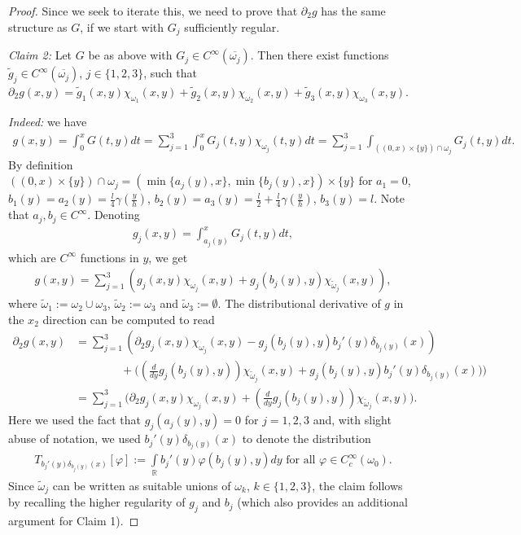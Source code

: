 \documentclass[a4paper, 10pt, twoside, notitlepage]{amsart}
\theoremstyle{plain}
\newcommand{\R}{\mathbb{R}}
\newcommand{\p}{\partial}
\begin{document}
\begin{proof}
\smallskip

Since we seek to iterate this, we need to prove that $\p_2 g$ has the same structure as $G$, if we start with $G_j$ sufficiently regular.

\smallskip

\emph{Claim 2:} Let $G$ be as above with $G_j\in C^\infty(\overline{\omega_j})$. Then there exist functions $\tilde g_j\in C^\infty(\overline{\omega_j})$, $j \in \{1,2,3\}$, such that $\p_2 g(x,y)=\tilde g_1(x,y)\chi_{\omega_1}(x,y)+\tilde g_2(x,y)\chi_{\omega_2}(x,y)+\tilde g_3(x,y)\chi_{\omega_3}(x,y)$.

\smallskip

\emph{Indeed:} we have
\begin{align*}
g(x,y)=\int_0^x G(t,y)dt = \sum_{j=1}^3 \int_0^x G_j(t,y)\chi_{\omega_j}(t,y)dt= \sum_{j=1}^3 \int_{((0,x)\times\{y\})\cap\omega_j} G_j(t,y)dt.
\end{align*}
By definition $((0,x)\times\{y\})\cap\omega_j=(\min\{a_j(y), x\}, \min\{b_j(y), x\})\times\{y\}$ for  $a_1=0$, $b_1(y)=a_2(y)=\frac{l}{4}\gamma(\frac{y}{h})$, $b_2(y)=a_3(y)=\frac{l}{2}+\frac{l}{4}\gamma(\frac{y}{h})$, $b_3(y)=l$. Note that $a_j, b_j\in C^\infty$.
Denoting
\begin{align*}
g_j(x,y)=\int_{a_j(y)}^x G_j(t,y)dt,
\end{align*}
which are $C^\infty$ functions in $y$, we get
\begin{align*}
g(x,y)=\sum_{j=1}^3 \left(g_j(x,y)\chi_{\omega_j}(x,y)+g_j(b_j(y),y)\chi_{\tilde\omega_j}(x,y) \right),
\end{align*}
where $\tilde \omega_1:=\omega_2\cup\omega_3$, $\tilde\omega_2:=\omega_3$ and $\tilde\omega_3:=\emptyset$.
The distributional derivative of $g$ in the $x_2$ direction can be computed to read
\begin{align*}
\p_2 g(x,y) &= \sum_{j=1}^3(\p_2g_j(x,y)\chi_{\omega_j}(x,y)-g_j(b_{j}(y),y) b_j'(y)\delta_{b_{j}(y)}(x)) \\
&\qquad\qquad +\Big(\left(\frac{d}{dy}g_j(b_j(y),y) \right)\chi_{\tilde{\omega}_j}(x,y)+g_j(b_{j}(y),y) b_j'(y)\delta_{b_{j}(y)}(x))\Big) \\
&= \sum_{j=1}^3\Big(\p_2g_j(x,y) \chi_{\omega_j}(x,y)+\left(\frac{d}{dy}g_j(b_j(y),y) \right) \chi_{\tilde{\omega}_j}(x,y)\Big).
\end{align*}
Here we used the fact that $g_j(a_j(y),y) = 0$ for $j=1,2,3$ and, with slight abuse of notation, we used $ b_j'(y)\delta_{b_{j}(y)}(x)$ to denote the distribution 
\begin{align*}
T_{b_j'(y) \delta_{b_{j}(y)}(x) }[\varphi] := \int\limits_{\R} b_j'(y) \varphi(b_j(y),y) dy \mbox{ for all } \varphi \in C_c^{\infty}(\omega_0).
\end{align*}
Since $\tilde{\omega}_j$ can be written as suitable unions of $\omega_k$, $k\in \{1,2,3\}$, the claim follows by recalling the higher regularity of $g_j$ and $b_j$ (which also provides an additional argument for Claim 1).


\end{proof}
\end{document}
